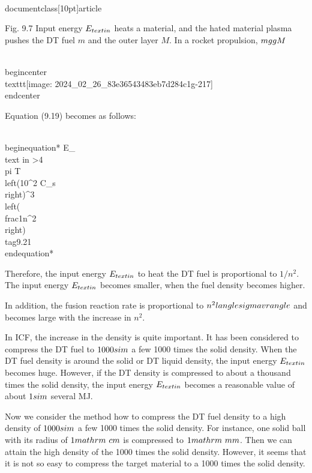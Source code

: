 \\documentclass[10pt]{article}
\begin{document}
{{{{{{Fig. 9.7 Input energy $E_{\\text {in }}$ heats a material, and the hated material plasma pushes the DT fuel $m$ and the outer layer $M$. In a rocket propulsion, $m \\gg M$

\\begin{center}
\\texttt{[image: 2024\_02\_26\_83e36543483eb7d284c1g-217]}
\\end{center}

Equation (9.19) becomes as follows:


\\begin{equation*}
E_{\\text {in }}>4 \\pi T\\left(10^{2} C_{s}\\right)^{3}\\left(\\frac{1}{n^{2}}\\right) \\tag{9.21}
\\end{equation*}


Therefore, the input energy $E_{\\text {in }}$ to heat the DT fuel is proportional to $1 / n^{2}$. The input energy $E_{\\text {in }}$ becomes smaller, when the fuel density becomes higher.

In addition, the fusion reaction rate is proportional to $n^{2}\\langle\\sigma v\\rangle$ and becomes large with the increase in $n^{2}$.

In ICF, the increase in the density is quite important. It has been considered to compress the DT fuel to $1000 \\sim$ a few 1000 times the solid density. When the DT fuel density is around the solid or DT liquid density, the input energy $E_{\\text {in }}$ becomes huge. However, if the DT density is compressed to about a thousand times the solid density, the input energy $E_{\\text {in }}$ becomes a reasonable value of about $1 \\sim$ several MJ.

Now we consider the method how to compress the DT fuel density to a high density of $1000 \\sim$ a few 1000 times the solid density. For instance, one solid ball with its radius of $1 \\mathrm{~cm}$ is compressed to $1 \\mathrm{~mm}$. Then we can attain the high density of the 1000 times the solid density. However, it seems that it is not so easy to compress the target material to a 1000 times the solid density.

}}}}}}
\end{document}
